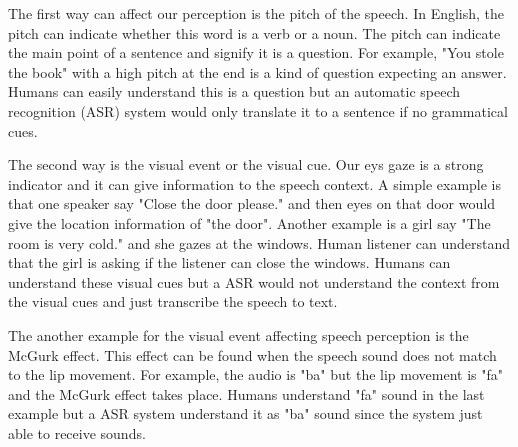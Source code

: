 \documentclass[12pt]{article}
\newenvironment{problem}[2][Problem]{\begin{trivlist}
\item[\hskip \labelsep {\bfseries #1}\hskip \labelsep {\bfseries #2.}]}{\end{trivlist}}
\begin{document}
\begin{problem}{1.3}
    The first way can affect our perception is the pitch of the speech. In English,
    the pitch can indicate whether this word is a verb or a noun. The pitch
    can indicate the main point of a sentence and signify it is a question. 
    For example,
    "You stole the book" with a high pitch at the end is a kind of question 
    expecting an answer. Humans can easily understand this is a question but 
    an automatic speech recognition (ASR) system would only translate it to 
    a sentence if no grammatical cues. 
    
    The second way is the visual event or the visual cue. Our eys gaze is a 
    strong indicator and it can give information to the speech context. A simple
    example is that one speaker say "Close the door please." and then eyes on that
    door would give the location information of "the door". Another example is 
    a girl say "The room is very cold." and she gazes at the windows. Human listener
    can understand that the girl is asking if the listener can close the windows.
    Humans can understand these visual cues but a ASR would not understand the
    context from the visual cues and just transcribe the speech to text.

    The another example for the visual event affecting speech perception 
    is the McGurk effect. This effect can be found when the speech sound does 
    not match to the lip movement. For example, the audio is "ba" but the lip 
    movement is "fa" and the McGurk effect takes place. Humans understand "fa"
    sound in the last example but a ASR system understand it as "ba" sound since
    the system just able to receive sounds.
\end{problem}

\pagebreak
\end{document}

